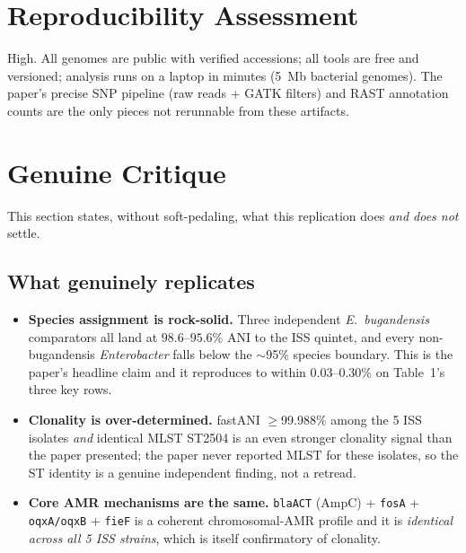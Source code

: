 \documentclass[11pt]{article}
\begin{document}
\section{Reproducibility Assessment}
High. All genomes are public with verified accessions; all tools are free and versioned; analysis
runs on a laptop in minutes (5~Mb bacterial genomes). The paper's precise SNP pipeline
(raw reads + GATK filters) and RAST annotation counts are the only pieces not rerunnable from
these artifacts.

\section{Genuine Critique}
This section states, without soft-pedaling, what this replication does \emph{and does not} settle.

\subsection*{What genuinely replicates}
\begin{itemize}[leftmargin=1.3em]
  \item \textbf{Species assignment is rock-solid.} Three independent \textit{E.~bugandensis} comparators
        all land at $98.6$--$95.6\%$ ANI to the ISS quintet, and every non-bugandensis \textit{Enterobacter}
        falls below the $\sim$95\% species boundary. This is the paper's headline claim and it
        reproduces to within 0.03--0.30\% on Table~1's three key rows.
  \item \textbf{Clonality is over-determined.} fastANI $\geq$99.988\% among the 5 ISS isolates
        \emph{and} identical MLST ST2504 is an even stronger clonality signal than the paper
        presented; the paper never reported MLST for these isolates, so the ST identity is a
        genuine independent finding, not a retread.
  \item \textbf{Core AMR mechanisms are the same.} \texttt{blaACT} (AmpC) + \texttt{fosA} +
        \texttt{oqxA/oqxB} + \texttt{fieF} is a coherent chromosomal-AMR profile and it is
        \emph{identical across all 5 ISS strains}, which is itself confirmatory of clonality.
\end{itemize}
\end{document}
